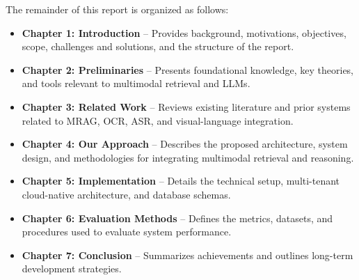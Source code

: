 The remainder of this report is organized as follows:

\begin{itemize}
    \item \textbf{Chapter 1: Introduction} – Provides background, motivations, objectives, scope, challenges and solutions, and the structure of the report.
    \item \textbf{Chapter 2: Preliminaries} – Presents foundational knowledge, key theories, and tools relevant to multimodal retrieval and LLMs.
    \item \textbf{Chapter 3: Related Work} – Reviews existing literature and prior systems related to MRAG, OCR, ASR, and visual-language integration.
    \item \textbf{Chapter 4: Our Approach} – Describes the proposed architecture, system design, and methodologies for integrating multimodal retrieval and reasoning.
    \item \textbf{Chapter 5: Implementation} – Details the technical setup, multi-tenant cloud-native architecture, and database schemas.
    \item \textbf{Chapter 6: Evaluation Methods} – Defines the metrics, datasets, and procedures used to evaluate system performance.
    \item \textbf{Chapter 7: Conclusion} – Summarizes achievements and outlines long-term development strategies.
\end{itemize}

\newpage

